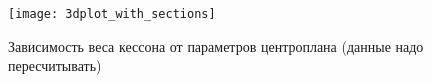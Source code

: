 \begin{figure}[ht]
\captionsetup{justification=centering}
\caption{Зависимость веса кессона от параметров центроплана (данные надо пересчитывать)}
\texttt{[image: 3dplot\_with\_sections]}
\def\svgwidth{\textwidth}
%
\label{fig:Optimization3dplot}
\end{figure}


